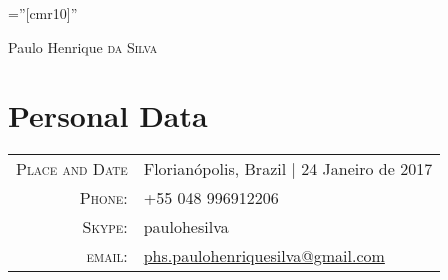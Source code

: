 \documentclass[a4paper,10pt]{article}
\begin{document}

\pagestyle{empty} %

\font\fb=''[cmr10]'' %

\par{\centering
		{\Huge Paulo Henrique \textsc{da Silva}
	}\bigskip\par}

\section{Personal Data}

\begin{tabular}{rl}
    \textsc{Place and Date} & Florianópolis, Brazil  | 24 Janeiro de 2017 \\
    \textsc{Phone:}     & +55 048 996912206\\
    \textsc{Skype:}     & paulohesilva\\
    \textsc{email:}     & \href{mailto:phs.paulohenriquesilva@gmail.com}{phs.paulohenriquesilva@gmail.com}
\end{tabular}

\end{document}

